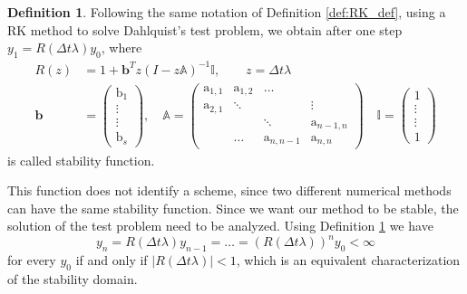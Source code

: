 \documentclass[a4paper,11pt ]{report}
\theoremstyle{definition}
\newtheorem{definition}{Definition}
\begin{document}
\begin{definition}{}
Following the same notation of Definition \ref{def:RK_def}, using a RK method to solve Dahlquist's test problem, we obtain after one step $y_1 = R(\Delta t \lambda)y_0$, where
\begin{align*}
R(z)&=1+\textbf{b}^{T}z(I-z\mathbb{A})^{-1}\mathbb{I}, \qquad z=\Delta t \lambda\\
\textbf{b}&=
\begin{pmatrix}
\text{b}_1\\
\vdots \\
\vdots \\
\text{b}_s
\end{pmatrix},
\quad \mathbb{A}=
\begin{pmatrix}
\text{a}_{1,1} & \text{a}_{1,2} & \hdots & \\
\text{a}_{2,1} & \ddots & & \vdots\\
&& \ddots & \text{a}_{n-1,n}\\
& \hdots & \text{a}_{n,n-1}& \text{a}_{n,n}
\end{pmatrix}
\quad
\mathbb{I}=
\begin{pmatrix}
1\\
\vdots\\
\vdots\\
1
\end{pmatrix}
\end{align*}\label{Stab_func}
is called stability function.
\label{def:stab_func}
\end{definition}{}
This function does not identify a scheme, since two different numerical methods can have the same stability function.
Since we want our method to be stable, the solution of the test problem need to be analyzed. Using Definition \ref{Stab_func} we have 
\begin{equation*}
y_n = R(\Delta t \lambda)y_{n-1} = \dots = (R(\Delta t \lambda))^n y_{0}<\infty
\end{equation*}
for every $y_{0}$ if and only if $\vert R(\Delta t \lambda) \vert < 1$, which is an equivalent characterization of the stability domain.
\end{document}

